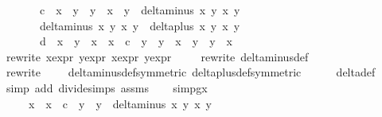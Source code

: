 \begin{isabellebody}
\ \ \ \ \ \ c\ {\isacharasterisk}\ {\isacharparenleft}x{}\ {\isacharasterisk}\ y{}\ {\isacharplus}\ y{}\ {\isacharasterisk}\ x{}{\isacharparenright}\ {\isacharasterisk}\ y{}\ {\isacharasterisk}\ delta{\isacharunderscore}minus\ x{}\ y{}\ x{}\ y{}{\isacharparenright}\ {\isacharasterisk}\isanewline
\ \ \ \ \ \ {\isacharparenleft}delta{\isacharunderscore}minus\ x{}\ y{}\ x{}\ y{}\ {\isacharasterisk}\ delta{\isacharunderscore}plus\ x{}\ y{}\ x{}\ y{}\ {\isacharminus}\ \isanewline
\ \ \ \ \ \ d\ {\isacharasterisk}\ x{}\ {\isacharasterisk}\ y{}\ {\isacharasterisk}\ {\isacharparenleft}x{}\ {\isacharasterisk}\ x{}\ {\isacharminus}\ c\ {\isacharasterisk}\ y{}\ {\isacharasterisk}\ y{}{\isacharparenright}\ {\isacharasterisk}\ {\isacharparenleft}x{}\ {\isacharasterisk}\ y{}\ {\isacharplus}\ y{}\ {\isacharasterisk}\ x{}{\isacharparenright}{\isacharparenright}\isanewline
\ \ {\isachardoublequoteclose}\isanewline
\ \ \ \ \isamarkupfalse%
{\isacharparenleft}rewrite\ x{}{\isacharprime}{\isacharunderscore}expr\ y{}{\isacharprime}{\isacharunderscore}expr\ x{}{\isacharprime}{\isacharunderscore}expr\ y{}{\isacharprime}{\isacharunderscore}expr{\isacharparenright}{\isacharplus}\isanewline
\ \ \ \ \isamarkupfalse%
{\isacharparenleft}rewrite\ delta{\isacharunderscore}minus{\isacharunderscore}def{\isacharparenright}\isanewline
\ \ \ \ \isamarkupfalse%
{\isacharparenleft}rewrite\ \ {\isachardoublequoteopen}{\isacharunderscore}\ {\isacharslash}\ {\isasymhole}{\isachardoublequoteclose}\ delta{\isacharunderscore}minus{\isacharunderscore}def{\isacharbrackleft}symmetric{\isacharbrackright}\ delta{\isacharunderscore}plus{\isacharunderscore}def{\isacharbrackleft}symmetric{\isacharbrackright}{\isacharparenright}{\isacharplus}\isanewline
\ \ \ \ \isamarkupfalse%
\ delta{\isacharunderscore}def\isanewline
\ \ \ \ \isamarkupfalse%
{\isacharparenleft}simp\ add{\isacharcolon}\ divide{\isacharunderscore}simps\ assms{\isacharparenleft}{}{\isacharminus}{}{\isacharparenright}{\isacharparenright}\isanewline
\isanewline
\ \ \isamarkupfalse%
\ simp{}gx{\isacharcolon}\isanewline
\ \ \ \ {\isachardoublequoteopen}{\isacharparenleft}x{}\ {\isacharasterisk}\ x{}{\isacharprime}\ {\isacharminus}\ c\ {\isacharasterisk}\ y{}\ {\isacharasterisk}\ y{}{\isacharprime}{\isacharparenright}\ {\isacharasterisk}\ delta{\isacharunderscore}minus\ x{}{\isacharprime}\ y{}{\isacharprime}\ x{}\ y{}\ {\isacharasterisk}\ \isanewline

\end{isabellebody}
